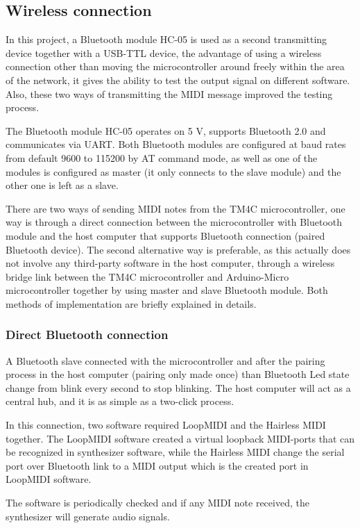 \documentclass{article}
\begin{document}
\subsection{Wireless connection}
In this project, a Bluetooth module HC-05 is used as a second transmitting device together with a USB-TTL device, the advantage of using a wireless connection other than moving the microcontroller around freely within the area of the network, it gives the ability to test the output signal on different software. Also, these two ways of transmitting the MIDI message improved the testing process. 

The Bluetooth module HC-05 operates on 5 V, supports Bluetooth 2.0 and communicates via UART. Both Bluetooth modules are configured at baud rates from default 9600 to 115200 by AT command mode, as well as one of the modules is configured as master (it only connects to the slave module) and the other one is left as a slave.

There are two ways of sending MIDI notes from the TM4C microcontroller, one way is through a direct connection between the microcontroller with Bluetooth module and the host computer that supports Bluetooth connection (paired Bluetooth device). The second alternative way is preferable, as this actually does not involve any third-party software in the host computer, through a wireless bridge link between the TM4C microcontroller and Arduino-Micro microcontroller together by using master and slave Bluetooth module. Both methods of implementation are briefly explained in details.

\subsubsection{Direct Bluetooth connection}
A Bluetooth slave connected with the microcontroller and after the pairing process in the host computer (pairing only made once) than Bluetooth Led state change from blink every second to stop blinking. The host computer will act as a central hub, and it is as simple as a two-click process.

In this connection, two software required LoopMIDI \cite{loopmidi} and the Hairless MIDI \cite{hairlessmidiserial} together. The LoopMIDI software created a virtual loopback MIDI-ports that can be recognized in synthesizer software, while the Hairless MIDI change the serial port over Bluetooth link to a MIDI output which is the created port in LoopMIDI software. 

The software is periodically checked and if any MIDI note received, the synthesizer will generate audio signals.
\end{document}
